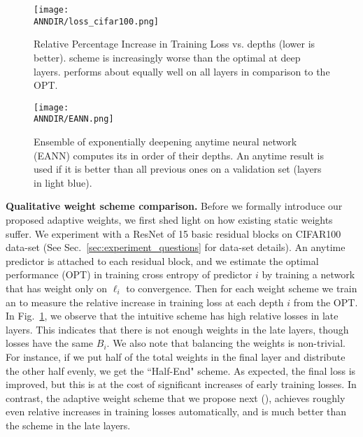 \begin{figure}
    \centering
        \texttt{[image: \\ANNDIR/loss\_cifar100.png]}
    \caption{Relative Percentage Increase in Training Loss vs. depths (lower is better). \const scheme is increasingly worse than the optimal at deep layers. \adaloss performs about equally well on all layers in comparison to the OPT.}
    \label{fig:loss_cifar100}
\end{figure}

\begin{figure}
    \centering
    \texttt{[image: \\ANNDIR/EANN.png]}
    \caption{ Ensemble of exponentially deepening anytime neural network (EANN) computes its \anns in order of their depths. An anytime result is used if it is better than all previous ones on a validation set (layers in light blue).} 
     \label{fig:eann}
\end{figure}
    


\textbf{Qualitative weight scheme comparison.} Before we formally introduce our proposed adaptive weights, we first shed light on how existing static weights suffer. We experiment with a ResNet of 15 basic residual blocks on CIFAR100~\cite{cifar} data-set (See Sec.~\ref{sec:experiment_questions} for data-set details). An anytime predictor is attached to each residual block, and we estimate the optimal performance (OPT) in training cross entropy of predictor $i$ by training a network that has weight only on $\ell_i$ to convergence. Then for each weight scheme we train an \ann to measure the relative increase in training loss at each depth $i$ from the OPT. In Fig.~\ref{fig:loss_cifar100}, we observe that the intuitive \const scheme has high relative losses in late layers. This indicates that there is not enough weights in the late layers, though losses have the same $B_i$.  We also note that balancing the weights is non-trivial. For instance, if we put half of the total weights in the final layer and distribute the other half evenly, we get the ``Half-End" scheme. As expected, the final loss is improved, but this is at the cost of significant increases of early training losses. In contrast, the adaptive weight scheme that we propose next (\adaloss), achieves roughly even relative increases in training losses automatically, and is much better than the \const scheme in the late layers.



